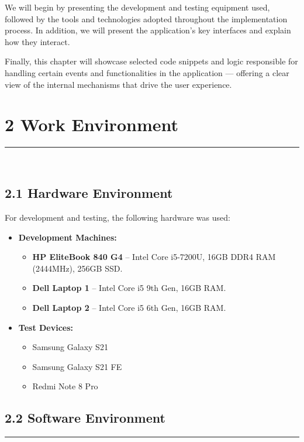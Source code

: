 \documentclass[12pt]{report}
\begin{document}
\noindent We will begin by presenting the development and testing equipment used, followed by the tools and technologies adopted throughout the implementation process. In addition, we will present the application's key interfaces and explain how they interact.\vspace{0.5cm}

\noindent Finally, this chapter will showcase selected code snippets and logic responsible for handling certain events and functionalities in the application — offering a clear view of the internal mechanisms that drive the user experience.


\section*{2 Work Environment}
\vspace{-0.5cm}
\rule{0.45\linewidth}{1pt} \\[-1.2cm]
\subsection*{2.1 Hardware Environment}
For development and testing, the following hardware was used:

\begin{itemize}
	\item \textbf{Development Machines:}
	      \begin{itemize}
		      \item \textbf{HP EliteBook 840 G4} – Intel Core i5-7200U, 16GB DDR4 RAM (2444MHz), 256GB SSD.
		      \item \textbf{Dell Laptop 1} – Intel Core i5 9th Gen, 16GB RAM.
		      \item \textbf{Dell Laptop 2} – Intel Core i5 6th Gen, 16GB RAM.
	      \end{itemize}

	\item \textbf{Test Devices:}
	      \begin{itemize}
		      \item Samsung Galaxy S21
		      \item Samsung Galaxy S21 FE
		      \item Redmi Note 8 Pro
	      \end{itemize}
\end{itemize}

\subsection*{2.2 Software Environment}
\vspace{-0.3cm}
\rule{0.40\linewidth}{0.5pt} \\[-1.2cm]
\end{document}
